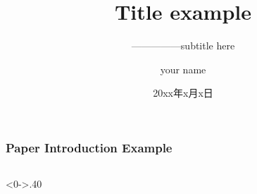 \documentclass{beamer}%
\title[beamer template]{\zihao{5} Title example} %
\subtitle{\quad\quad\quad\quad\quad—————subtitle here}
\author{\noindent your name}
\institute[SDU]
{   
	\noindent your institute\\
	\medskip
	\noindent \textit{ youremail@example.com} 
}
\date{\noindent 20xx年x月x日}
\begin{document}
\begin{frame}
	\titlepage %
\end{frame}

\begin{frame}
	\frametitle{Paper Introduction Example}
	
	\begin{columns}[T] %
		\begin{column}<0->{.40\textwidth}
			\begin{figure}[htpb]
				\centering
				\label{fig:paper}
			\end{figure}
		\end{column}%
		

\end{columns}
\end{frame}
\end{document}
